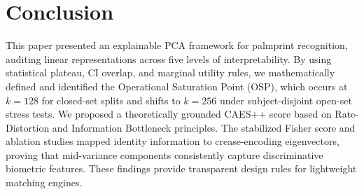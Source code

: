 \documentclass[conference]{IEEEtran}
\begin{document}
\section{Conclusion}
\label{sec:conclusion}

This paper presented an explainable PCA framework for palmprint recognition, auditing linear representations across five levels of interpretability. By using statistical plateau, CI overlap, and marginal utility rules, we mathematically defined and identified the Operational Saturation Point (OSP), which occurs at $k=128$ for closed-set splits and shifts to $k=256$ under subject-disjoint open-set stress tests. We proposed a theoretically grounded CAES++ score based on Rate-Distortion and Information Bottleneck principles. The stabilized Fisher score and ablation studies mapped identity information to crease-encoding eigenvectors, proving that mid-variance components consistently capture discriminative biometric features. These findings provide transparent design rules for lightweight matching engines.
\end{document}
